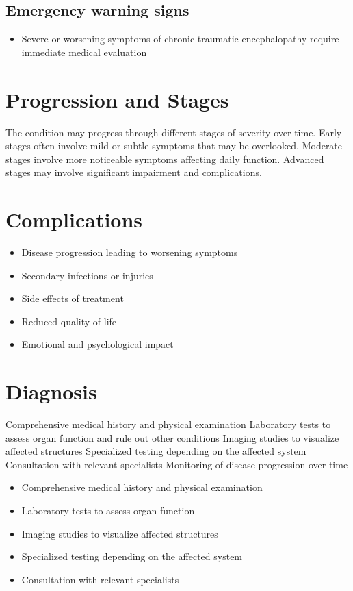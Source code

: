 \subsection{Emergency warning signs}
\begin{itemize}[noitemsep]
  \item Severe or worsening symptoms of chronic traumatic encephalopathy require immediate medical evaluation
\end{itemize}
\section{Progression and Stages}
The condition may progress through different stages of severity over time. Early stages often involve mild or subtle symptoms that may be overlooked. Moderate stages involve more noticeable symptoms affecting daily function. Advanced stages may involve significant impairment and complications.
\section{Complications}
\begin{itemize}[noitemsep]
  \item Disease progression leading to worsening symptoms
  \item Secondary infections or injuries
  \item Side effects of treatment
  \item Reduced quality of life
  \item Emotional and psychological impact
\end{itemize}
\section{Diagnosis}
Comprehensive medical history and physical examination Laboratory tests to assess organ function and rule out other conditions Imaging studies to visualize affected structures Specialized testing depending on the affected system Consultation with relevant specialists Monitoring of disease progression over time

\begin{itemize}[noitemsep]
  \item Comprehensive medical history and physical examination
  \item Laboratory tests to assess organ function
  \item Imaging studies to visualize affected structures
  \item Specialized testing depending on the affected system
  \item Consultation with relevant specialists
\end{itemize}
